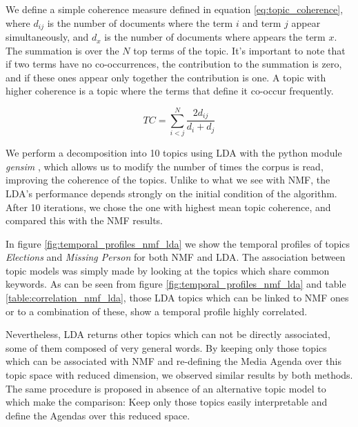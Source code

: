 \documentclass{bmcart}
\begin{document}
\par We define a simple coherence measure defined in equation \ref{eq:topic_coherence}, where $d_{ij}$ is the number of documents where the term $i$ and term $j$ appear simultaneously, and $d_{x}$ is the number of documents where appears the term $x$. The summation is over the $N$ top terms of the topic.
It's important to note that if two terms have no co-occurrences, the contribution to the summation is zero, and if these ones appear only together the contribution is one.
A topic with higher coherence is a topic where the terms that define it co-occur frequently.

\begin{equation}
TC = \sum_{i < j}^N \frac{2d_{ij}}{d_i + d_j}
\label{eq:topic_coherence} 
\end{equation}

\par We perform a decomposition into 10 topics using LDA with the python module \emph{gensim} \cite{rehurek_lrec}, which allows us to modify the number of times the corpus is read, improving the coherence of the topics.
Unlike to what we see with NMF, the LDA's performance depends strongly on the initial condition of the algorithm. After 10 iterations, we chose the one with highest mean topic coherence, and compared this with the NMF results.

\par In figure \ref{fig:temporal_profiles_nmf_lda} we show the temporal profiles of topics \emph{Elections} and \emph{Missing Person} for both NMF and LDA. The association between topic models was simply made by looking at the topics which share common keywords.
As can be seen from figure \ref{fig:temporal_profiles_nmf_lda} and table \ref{table:correlation_nmf_lda}, those LDA topics which can be linked to NMF ones or to a combination of these, show a temporal profile highly correlated. 

\par Nevertheless, LDA returns other topics which can not be directly associated, some of them composed of very general words. 
By keeping only those topics which can be associated with NMF and re-defining the Media Agenda over this topic space with reduced dimension, we observed similar results by both methods.  
The same procedure is proposed in absence of an alternative topic model to which make the comparison: Keep only those topics easily interpretable and define the Agendas over this reduced space.
 
\end{document}
